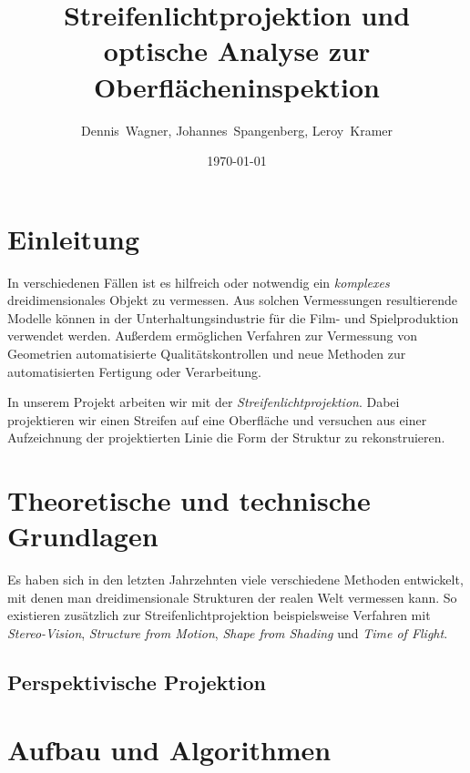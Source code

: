 \documentclass[ngerman,a4paper]{scrartcl}
\title%
{
	Streifenlichtprojektion und optische Analyse zur Oberflächeninspektion
}
\author[D. Wagner, J. Spangenberg, L. Kramer]
{
	Dennis~Wagner,
	Johannes~Spangenberg,
	Leroy~Kramer
}
\date{\today}
\begin{document}


\tableofcontents
\newpage


\section{Einleitung}

In verschiedenen Fällen ist es hilfreich oder notwendig ein \emph{komplexes} dreidimensionales Objekt zu vermessen. Aus solchen Vermessungen resultierende Modelle können in der Unterhaltungsindustrie für die Film- und Spielproduktion verwendet werden. Außerdem ermöglichen Verfahren zur Vermessung von Geometrien automatisierte Qualitätskontrollen und neue Methoden zur automatisierten Fertigung oder Verarbeitung.

In unserem Projekt arbeiten wir mit der \emph{Streifenlichtprojektion}. Dabei projektieren wir einen Streifen auf eine Oberfläche und versuchen aus einer Aufzeichnung der projektierten Linie die Form der Struktur zu rekonstruieren.


\section{Theoretische und technische Grundlagen}

Es haben sich in den letzten Jahrzehnten viele verschiedene Methoden entwickelt, mit denen man dreidimensionale Strukturen der realen Welt vermessen kann. So existieren zusätzlich zur Streifenlichtprojektion beispielsweise Verfahren mit \emph{Stereo-Vision}, \emph{Structure from Motion}, \emph{Shape from Shading} und \emph{Time of Flight}.

\subsection{Perspektivische Projektion}


\section{Aufbau und Algorithmen}
\end{document}
